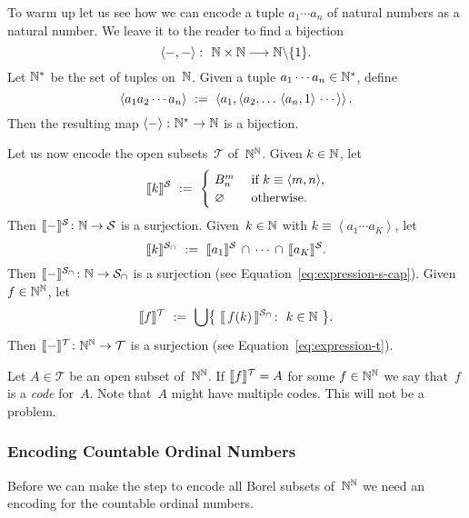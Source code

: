 \documentclass[main.tex]{subfiles}
\begin{document}
To warm up
let us see how we can encode 
a tuple $a_1 \dotsb a_n$ of natural numbers as a natural number.
We leave it to the reader to 
find a bijection
\begin{equation*}
\left< -,-\right>\colon \ \mathbb{N}\times \mathbb{N} \longrightarrow \mathbb{N} \backslash\{1\}.
\end{equation*}
Let $\mathbb{N}^*$ be the set of tuples on~$\mathbb{N}$.
Given a tuple $a_1\dotsb a_n \in \mathbb{N}^*$, define
\begin{equation*}
\left< a_1a_2  \dotsb a_n \right>\ \eqdf\ 
\left<a_1, \left<a_2,\dotsc \,\left<a_n, 1 \right>\,\dotsb\,\right>\right>.
\end{equation*}
Then the resulting map  $\left<-\right>\colon \mathbb{N}^* \rightarrow \mathbb{N}$
is a bijection.

Let us now encode the open subsets~$\mathcal{T}$ of~$\mathbb{N}^{\mathbb{N}}$.
Given $k \in \mathbb{N}$, let
\begin{equation*}
 \decode{k}^{\mathcal{S}}
\ \eqdf \ 
\begin{cases}
\ B^m_n & \text{ if $k\equiv\left<m,n\right>$}, \\
\ \varnothing &\text{ otherwise.}
\end{cases}
\end{equation*}
Then $\decode-^{\mathcal{S}}\colon\N\ra \mathcal{S}$
is a surjection.
Given~$k\in \mathbb{N}$ with $k\equiv \left<a_1\dotsb a_K\right>$, let
\begin{equation*}
 \decode{k}^{\mathcal{S}_\cap}
\ \eqdf\ 
\decode{a_1}^\mathcal{S} \,\cap\,\dotsb\,\cap\,\decode{a_K}^\mathcal{S}.
\end{equation*}
Then $\decode-^{\mathcal{S}_\cap}\colon \N\ra \mathcal{S}_\cap$
is a surjection (see Equation~\eqref{eq:expression-s-cap}).
Given $f \in \mathbb{N}^{\mathbb{N}}$, let
\begin{equation*}
\decode{f}^{\mathcal{T}}
\ \eqdf\ 
 \bigcup\bigl\{\ 
\decode{\,f(k)\,}^{\mathcal{S}_\cap}\colon\ k\in\N\ \bigr\}.
\end{equation*}
Then $\decode-^{\mathcal{T}}\colon \N^\N\ra \mathcal{T}$
is a surjection
(see Equation~\eqref{eq:expression-t}).

Let $A\in \mathcal{T}$
be an open subset of~$\mathbb{N}^{\mathbb{N}}$.
If
$\decode{f}^\mathcal{T}=A$
for some 
 $f\in \mathbb{N}^{\mathbb{N}}$ 
we say
that~$f$ is a \emph{code} for~$A$.
Note that~$A$ might have multiple codes.
This will not be a problem.

\subsubsection{Encoding Countable Ordinal Numbers}$\,$\\
Before we can make the step
to encode all Borel subsets of~$\mathbb{N}^{\mathbb{N}}$
we need an encoding for
the countable ordinal numbers.
\end{document}
